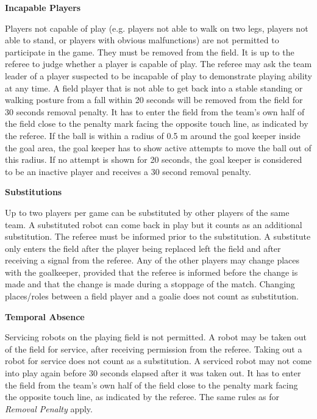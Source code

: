\bigskip

{\bfseries Incapable Players}

Players not capable of play (e.g. players not able to walk on two legs,
players not able to stand, or players with obvious malfunctions)
are not permitted to participate in the game.
They must be removed from the field.
It is up to the referee to judge whether a player is capable of play.
The referee may ask the team leader of a player suspected to be incapable of
play to demonstrate playing ability at any time.
A field player that is not able to get back into a stable standing or walking
posture from a fall within 20 seconds will be removed from the field for 30
seconds removal penalty.
It has to enter the field from the team's own half of the field close to the
penalty mark facing the opposite touch line, as indicated by the referee.
If the ball is within a radius of 0.5 m around the goal keeper inside the goal area,
the goal keeper has to show active attempts to move the ball out of this radius.
If no attempt is shown for 20 seconds, the goal keeper is considered to be an
inactive player and receives a 30 second removal penalty.

\bigskip

{\bfseries Substitutions}

Up to two players per game can be substituted by other players of the same team.
A substituted robot can come back in play but it counts as an additional substitution.
The referee must be informed prior to the substitution.
A substitute only enters the field after the player being replaced left the
field and after receiving a signal from the referee.
Any of the other players may change places with the goalkeeper,
provided that the referee is informed before the change is made and that the
change is made during a stoppage of the match.
Changing places/roles between a field player and a goalie does not count as
substitution.

\bigskip

{\bfseries Temporal Absence}

Servicing robots on the playing field is not permitted.
A robot may be taken out of the field for service,
after receiving permission from the referee.
Taking out a robot for service does not count as a substitution.
A serviced robot may not come into play again before 30 seconds elapsed after it
was taken out.
It has to enter the field from the team's own half of the field close to the
penalty mark facing the opposite touch line, as indicated by the referee.
The same rules as for \textit{Removal Penalty} apply.

